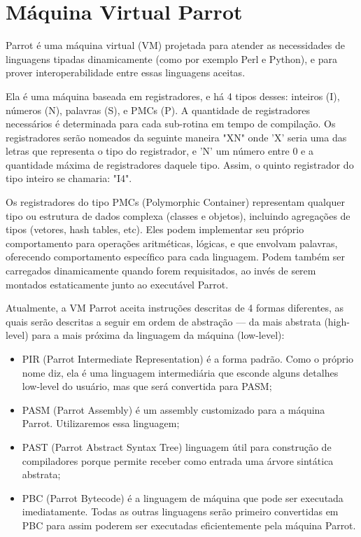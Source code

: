 \documentclass[12pt,a4paper,twoside]{report}
\begin{document}
\section{Máquina Virtual Parrot}

Parrot é uma máquina virtual (VM) projetada para atender as necessidades de linguagens tipadas dinamicamente (como por exemplo Perl e Python), e para prover interoperabilidade entre essas linguagens aceitas.

Ela é uma máquina baseada em registradores, e há 4 tipos desses: inteiros (I), números (N), palavras (S), e PMCs (P). A quantidade de registradores necessários é determinada para cada sub-rotina em tempo de compilação. Os registradores serão nomeados da seguinte maneira "XN" onde 'X' seria uma das letras que representa o tipo do registrador, e 'N' um número entre 0 e a quantidade máxima de registradores daquele tipo. Assim, o quinto registrador do tipo inteiro se chamaria: "I4".

Os registradores do tipo PMCs (Polymorphic Container) representam qualquer tipo ou estrutura de dados complexa (classes e objetos), incluindo agregações de tipos (vetores, hash tables, etc). Eles podem implementar seu próprio comportamento para operações aritméticas, lógicas, e que envolvam palavras, oferecendo comportamento específico para cada linguagem. Podem também ser carregados dinamicamente quando forem requisitados, ao invés de serem montados estaticamente junto ao executável Parrot.

Atualmente, a VM Parrot aceita instruções descritas de 4 formas diferentes, as quais serão descritas a seguir em ordem de abstração –– da mais abstrata (high-level) para a mais próxima da linguagem da máquina (low-level):

\begin{itemize}
    \item PIR (Parrot Intermediate Representation) é a forma padrão. Como o próprio nome diz, ela é uma linguagem intermediária que esconde alguns detalhes low-level do usuário, mas que será convertida para PASM;
    \item PASM (Parrot Assembly) é um assembly customizado para a máquina Parrot. Utilizaremos essa linguagem;
    \item PAST (Parrot Abstract Syntax Tree) linguagem útil para construção de compiladores porque permite receber como entrada uma árvore sintática abstrata;
    \item PBC (Parrot Bytecode) é a linguagem de máquina que pode ser executada imediatamente. Todas as outras linguagens serão primeiro convertidas em PBC para assim poderem ser executadas eficientemente pela máquina Parrot.
\end{itemize}
\end{document}
